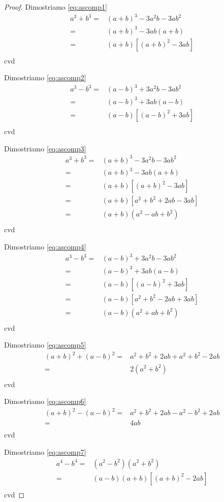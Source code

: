 \begin{proof}
	Dimostriamo \ref{eq:ascomp1}
	\begin{align*}
	a^3+b^3=&{}(a+b)^3-3a^2b-3ab^2\\
	=&{}(a+b)^3-3ab(a+b)\\
	=&{}(a+b)[(a+b)^2-3ab]\\
	\end{align*}
	cvd
	
		Dimostriamo \ref{eq:ascomp2}
	\begin{align*}
	a^3-b^3=&{}(a-b)^3+3a^2b-3ab^2\\
	=&{}(a-b)^3+3ab(a-b)\\
	=&{}(a-b)[(a-b)^2+3ab]\\
	\end{align*}
	cvd
	
		Dimostriamo \ref{eq:ascomp3}
	\begin{align*}
	a^3+b^3=&{}(a+b)^3-3a^2b-3ab^2\\
	=&{}(a+b)^3-3ab(a+b)\\
	=&{}(a+b)[(a+b)^2-3ab]\\
	=&{}(a+b)[a^2+b^2+2ab-3ab]\\
	=&{}(a+b)(a^2-ab+b^2)\\
	\end{align*}
	cvd
	
	Dimostriamo \ref{eq:ascomp4}
	\begin{align*}
	a^3-b^3=&{}(a-b)^3+3a^2b-3ab^2\\
	=&{}(a-b)^3+3ab(a-b)\\
	=&{}(a-b)[(a-b)^2+3ab]\\
	=&{}(a-b)[a^2+b^2-2ab+3ab]\\
	=&{}(a-b)(a^2+ab+b^2)\\
	\end{align*}
	cvd
	
		Dimostriamo \ref{eq:ascomp5}
	\begin{align*}
(a+b)^2+(a-b)^2=&a^2+b^2+2ab+a^2+b^2-2ab\\
=&2(a^2+b^2)\\
	\end{align*}
	cvd
	
		Dimostriamo \ref{eq:ascomp6}
\begin{align*}
(a+b)^2-(a-b)^2=&a^2+b^2+2ab-a^2-b^2+2ab\\
=&4ab\\
\end{align*}
cvd

		Dimostriamo \ref{eq:ascomp7}
\begin{align*}
a^4-b^4=&{}(a^2-b^2)(a^2+b^2)\\
=&{}(a-b)(a+b)[(a+b)^2-2ab]\\
\end{align*}
cvd


\end{proof}
